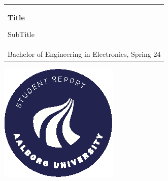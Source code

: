 %
\begin{titlepage}
\vspace*{\fill}
  \noindent%
  {\color{white}\colorbox{aaublue}{\begin{tabular}{@{}p{\textwidth}@{}}
    \begin{center}
    \Huge{\textbf{
      Title%
    }}
    \end{center}
    \begin{center}
      \Large{
        SubTitle  %
      }
    \end{center}
    \vspace{0.2cm}
   \begin{center}
    {\Large
      Rikke Udengaard%
    }\\
    \vspace{0.2cm}
    {\large
      Bachelor of Engineering in Electronics, Spring 24%
    }
   \end{center}
   \vspace{0.2cm}
   \begin{center}
    {\Large
      Bachelor Project
    }
   \end{center}
  \end{tabular}}}
  \vfill
  \begin{center}
    \includegraphics[width=0.2\paperwidth]{images/aau_logo_circle_en.eps}%
  \end{center}
\end{titlepage}
\clearpage
{}